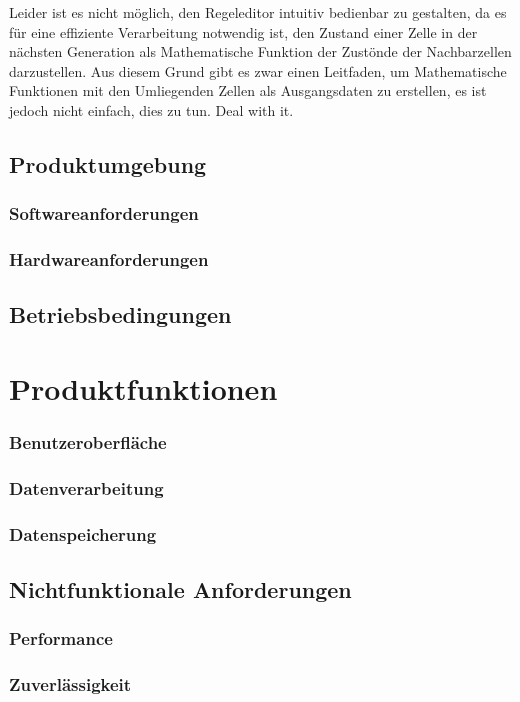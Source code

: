 \documentclass[12pt]{article}
\begin{document}
Leider ist es nicht möglich, den Regeleditor intuitiv bedienbar zu gestalten, da es für eine effiziente Verarbeitung notwendig ist, den Zustand einer Zelle in der nächsten Generation als Mathematische Funktion der Zustönde der Nachbarzellen darzustellen. Aus diesem Grund gibt es zwar einen Leitfaden, um Mathematische Funktionen mit den Umliegenden Zellen als Ausgangsdaten zu erstellen, es ist jedoch nicht einfach, dies zu tun. Deal with it.
\subsection{Produktumgebung}
\subsubsection{Softwareanforderungen}

\subsubsection{Hardwareanforderungen}
\subsection{Betriebsbedingungen}
\pagebreak
\section{Produktfunktionen}
\subsubsection{Benutzeroberfläche}
\subsubsection{Datenverarbeitung}
\subsubsection{Datenspeicherung}
\subsection{Nichtfunktionale Anforderungen}
\subsubsection{Performance}
\subsubsection{Zuverlässigkeit}
\pagebreak
\end{document}
